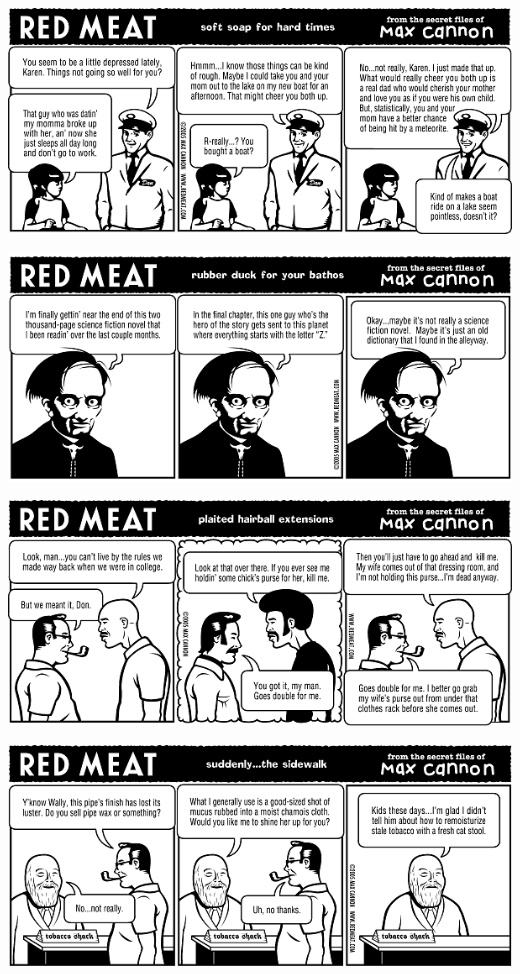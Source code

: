 \documentclass[a4paper,twoside,11pt]{article}
\begin{document}
\includegraphics[width=\textwidth]{redmeat_2005-08-30.png}



\includegraphics[width=\textwidth]{redmeat_2005-09-06.png}



\includegraphics[width=\textwidth]{redmeat_2005-09-13.png}



\includegraphics[width=\textwidth]{redmeat_2005-09-20.png}
\end{document}
